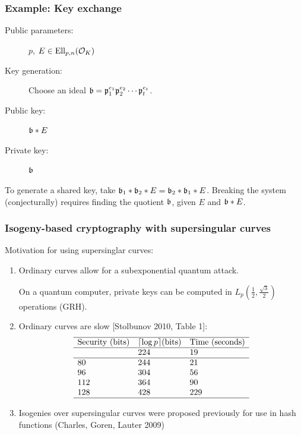 \documentclass{beamer}
\begin{document}
\begin{frame}
\frametitle{Example: Key exchange}
\begin{description}
\item[Public parameters:] $p$, $E \in {\operatorname{Ell}}_{p,n}(\mathcal{O}_K)$
\item[Key generation:] Choose an ideal ${\mathfrak{b}} = \mathfrak{p}_1^{e_1} \mathfrak{p}_2^{e_2}
  \cdots \mathfrak{p}_t^{e_t}$.
\item[Public key:] ${\mathfrak{b}} * E$
\item[Private key:] ${\mathfrak{b}}$
\end{description}
To generate a shared key, take ${\mathfrak{b}}_1 * {\mathfrak{b}}_2 * E = {\mathfrak{b}}_2 * {\mathfrak{b}}_1 * E$.
Breaking the system (conjecturally) requires finding the quotient
${\mathfrak{b}}$, given $E$ and ${\mathfrak{b}} * E$.
\end{frame}

\begin{frame}
\frametitle{Isogeny-based cryptography with supersingular curves}

Motivation for using supersinglar curves:
\begin{enumerate}
\item Ordinary curves allow for a subexponential quantum attack.
\begin{theorem}
  On a quantum computer, private keys can be computed in
  $L_{p}(\frac{1}{2}, \frac{\sqrt{3}}{2})$ operations (GRH).
\end{theorem}
\item Ordinary curves are slow [Stolbunov 2010, Table 1]:
\[
\begin{array}{lll} \hline
\text{Security (bits)} & \lceil \log p \rceil \text{(bits)} &
\text{Time (seconds)} \\ \hline & 224 & 19 \\ \hline
80 & 244 & 21 \\
96 & 304 & 56 \\
112 & 364 & 90 \\
128 & 428 & 229 \\ \hline
\end{array}
\]
\item Isogenies over supersingular curves were proposed previously for
  use in hash functions (Charles, Goren, Lauter 2009)
\end{enumerate}
\end{frame}
\end{document}
